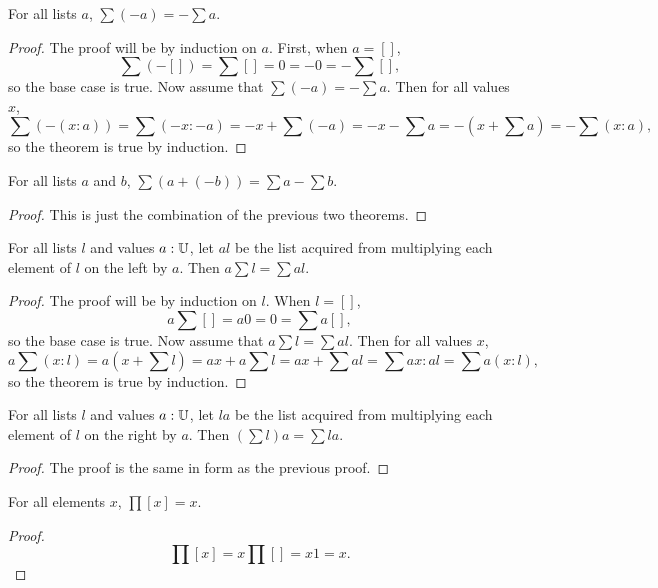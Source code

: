 \documentclass[../../math.tex]{subfiles}
\begin{document}
\begin{theorem} \label{list_sum_neg}
    For all lists $a$, $\sum (-a) = -\sum a$.
\end{theorem}
\begin{proof}
    The proof will be by induction on $a$.  First, when $a = []$,
    \[
        \sum (-[]) = \sum [] = 0 = -0 = -\sum [],
    \]
    so the base case is true.  Now assume that $\sum (-a) = -\sum a$.  Then for
    all values $x$,
    \[
        \sum (-(x : a)) = \sum(-x : -a) = -x + \sum (-a) = -x - \sum a = -(x +
        \sum a) = -\sum (x : a),
    \]
    so the theorem is true by induction.
\end{proof}

\begin{theorem} \label{list_sum_minus}
    For all lists $a$ and $b$, $\sum (a + (-b)) = \sum a - \sum b$.
\end{theorem}
\begin{proof}
    This is just the combination of the previous two theorems.
\end{proof}

\begin{theorem} \label{list_sum_lmult}
    For all lists $l$ and values $a : \mathbb{U}$, let $al$ be the list acquired from
    multiplying each element of $l$ on the left by $a$.  Then $a \sum l = \sum
    al$.
\end{theorem}
\begin{proof}
    The proof will be by induction on $l$.  When $l = []$,
    \[
        a \sum [] = a0 = 0 = \sum a[],
    \]
    so the base case is true.  Now assume that $a \sum l = \sum al$.  Then for
    all values $x$,
    \[
        a \sum (x : l)
        = a\left( x + \sum l \right)
        = ax + a \sum l
        = ax + \sum al
        = \sum ax : al
        = \sum a(x : l),
    \]
    so the theorem is true by induction.
\end{proof}

\begin{theorem} \label{list_sum_rmult}
    For all lists $l$ and values $a : \mathbb{U}$, let $la$ be the list acquired from
    multiplying each element of $l$ on the right by $a$.  Then $\left( \sum l
    \right) a = \sum la$.
\end{theorem}
\begin{proof}
    The proof is the same in form as the previous proof.
\end{proof}

\begin{theorem}
    For all elements $x$, $\prod [x] = x$.
\end{theorem}
\begin{proof}
    \[
        \prod [x] = x \prod [] = x 1 = x.
    \]
\end{proof}
\end{document}
